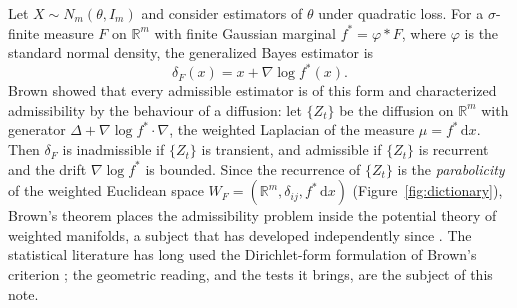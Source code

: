 \documentclass[11pt]{amsart}
\newcommand{\R}{\mathbb{R}}
\newcommand{\dd}{\,\mathrm{d}}
\theoremstyle{plain}
\theoremstyle{definition}
\theoremstyle{remark}
\begin{document}
Let $X\sim N_m(\theta,I_m)$ and consider estimators of $\theta$ under quadratic
loss. For a $\sigma$-finite measure $F$ on $\R^m$ with finite Gaussian marginal
$f^*=\varphi*F$, where $\varphi$ is the standard normal density, the generalized
Bayes estimator is
\[
\delta_F(x)=x+\nabla\log f^*(x) .
\]
Brown \cite{brown1971} showed that every admissible estimator is of this form
and characterized admissibility by the behaviour of a diffusion: let
$\{Z_t\}$ be the diffusion on $\R^m$ with generator
$\Delta+\nabla\log f^*\cdot\nabla$, the weighted Laplacian of the measure
$\mu=f^*\dd x$. Then $\delta_F$ is inadmissible if $\{Z_t\}$ is transient, and
admissible if $\{Z_t\}$ is recurrent and the drift $\nabla\log f^*$ is bounded.
Since the recurrence of $\{Z_t\}$ is the \emph{parabolicity} of the weighted
Euclidean space $W_F=(\R^m,\delta_{ij},f^*\dd x)$ (Figure~\ref{fig:dictionary}),
Brown's theorem places the
admissibility problem inside the potential theory of weighted manifolds, a
subject that has developed independently since
\cite{lyonssullivan1984,grigoryan1985,grigoryan1999}. The statistical
literature has long used the Dirichlet-form formulation of Brown's criterion
\cite{johnstonelalley1984,johnstone1986,eaton1992,takanashi2023}; the geometric
reading, and the tests it brings, are the subject of this note.
\end{document}
